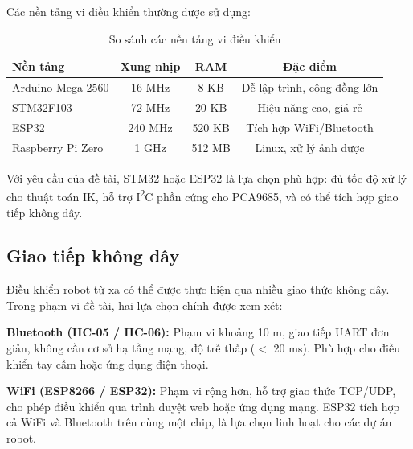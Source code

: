         Các nền tảng vi điều khiển thường được sử dụng:

        \begin{table}[h!]
        \centering
        \caption{So sánh các nền tảng vi điều khiển}
        \label{tab:mcu_compare}
        \begin{tabular}{|l|c|c|c|}
        \hline
        \textbf{Nền tảng} & \textbf{Xung nhịp} & \textbf{RAM} & \textbf{Đặc điểm} \\
        \hline
        Arduino Mega 2560 & 16 MHz  & 8 KB   & Dễ lập trình, cộng đồng lớn \\
        STM32F103         & 72 MHz  & 20 KB  & Hiệu năng cao, giá rẻ \\
        ESP32             & 240 MHz & 520 KB & Tích hợp WiFi/Bluetooth \\
        Raspberry Pi Zero & 1 GHz   & 512 MB & Linux, xử lý ảnh được \\
        \hline
        \end{tabular}
        \end{table}

        Với yêu cầu của đề tài, STM32 hoặc ESP32 là lựa chọn phù hợp: đủ tốc độ xử lý cho thuật toán IK, hỗ trợ I\textsuperscript{2}C phần cứng cho PCA9685, và có thể tích hợp giao tiếp không dây.

        \subsection{Giao tiếp không dây}

        \hspace{0.5cm} Điều khiển robot từ xa có thể được thực hiện qua nhiều giao thức không dây. Trong phạm vi đề tài, hai lựa chọn chính được xem xét:

        \textbf{Bluetooth (HC-05 / HC-06):} Phạm vi khoảng 10 m, giao tiếp UART đơn giản, không cần cơ sở hạ tầng mạng, độ trễ thấp ($<$ 20 ms). Phù hợp cho điều khiển tay cầm hoặc ứng dụng điện thoại.

        \textbf{WiFi (ESP8266 / ESP32):} Phạm vi rộng hơn, hỗ trợ giao thức TCP/UDP, cho phép điều khiển qua trình duyệt web hoặc ứng dụng mạng. ESP32 tích hợp cả WiFi và Bluetooth trên cùng một chip, là lựa chọn linh hoạt cho các dự án robot.
   


